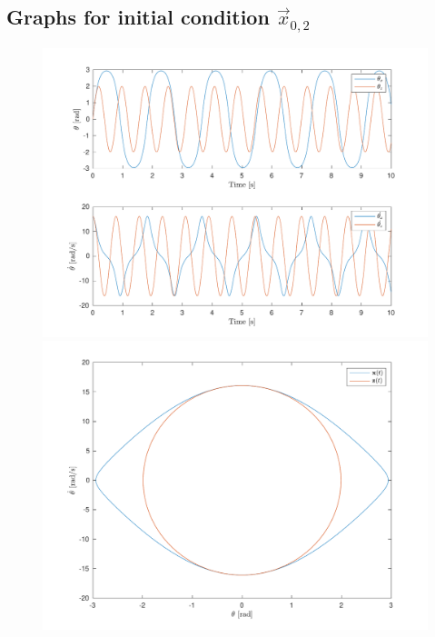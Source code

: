\documentclass[10pt]{article}
\begin{document}
\subsection{Graphs for initial condition \texorpdfstring{$\vec{x}_{0,2}$}{x02}}
\begin{figure}[ht]
    \centering
    \begin{minipage}[b]{0.45\textwidth}
        \centering
        \includegraphics[width=1\linewidth]{lab1/figs/section5_X0_2_state_evolution.pdf}
    \end{minipage}
    \begin{minipage}[b]{0.45\textwidth}
        \centering
        \includegraphics[width=1\linewidth]{lab1/figs/section5_X0_2_state_orbit.pdf}
    \end{minipage}
    
    \label{figure:X_0_2_state_evolution}
\end{figure}
\end{document}
